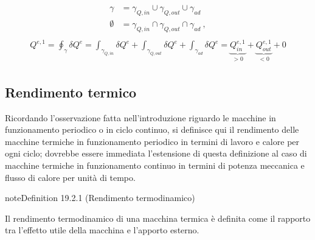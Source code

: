 \documentclass[letterpaper,10pt,italian]{jupyterBook}
\begin{document}
\begin{equation*}
\begin{split}\begin{aligned}
  \gamma & = \gamma_{Q,in} \cup \gamma_{Q,out} \cup \gamma_{ad} \\
  \emptyset & = \gamma_{Q,in} \cap \gamma_{Q,out} \cap \gamma_{ad} \ ,
\end{aligned}\end{split}
\end{equation*}\begin{equation*}
\begin{split}\begin{aligned}
  Q^{e,1} = \oint_{\gamma} \delta Q^{e} 
  = \int_{\gamma_{Q,in}} \delta Q^e + \int_{\gamma_{Q,out}} \delta Q^e + \int_{\gamma_{ad}} \delta Q^e 
  = \underbrace{Q^{e,1}_{in}}_{> 0} + \underbrace{Q^{e,1}_{out}}_{< 0} + 0
\end{aligned}\end{split}
\end{equation*}

\subsection{Rendimento termico}
\label{\detokenize{ch/thermodynamics/heat-engine-td-cycles:rendimento-termico}}\label{\detokenize{ch/thermodynamics/heat-engine-td-cycles:physics-hs-thermodynamics-heat-engine-td-cycles-efficiency}}
\sphinxAtStartPar
Ricordando l’osservazione fatta nell’introduzione riguardo le macchine in funzionamento periodico o in ciclo continuo, si definisce qui il rendimento delle macchine termiche in funzionamento periodico in termini di lavoro e calore per ogni ciclo; dovrebbe essere immediata l’estensione di questa definizione al caso di macchine termiche in funzionamento continuo in termini di potenza meccanica e flusso di calore per unità di tempo.
\label{ch/thermodynamics/heat-engine-td-cycles:td-efficiency}
\begin{sphinxadmonition}{note}{Definition 19.2.1 (Rendimento termodinamico)}



\sphinxAtStartPar
Il rendimento termodinamico di una macchina termica è definita come il rapporto tra l’effetto utile della macchina e l’apporto esterno.
\end{sphinxadmonition}
\end{document}
